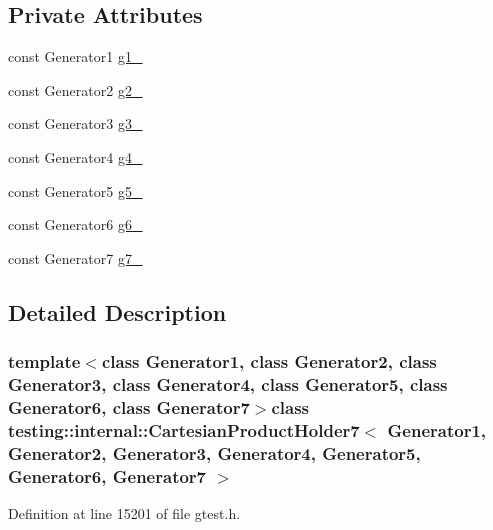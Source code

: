 \subsection*{\-Private \-Attributes}
\begin{DoxyCompactItemize}
\item 
const \-Generator1 \hyperlink{classtesting_1_1internal_1_1CartesianProductHolder7_a36a04c8f9e515291d6a093ab378084f7}{g1\-\_\-}
\item 
const \-Generator2 \hyperlink{classtesting_1_1internal_1_1CartesianProductHolder7_a6cfd9fa9a396d07747d5ebb1f05c7f22}{g2\-\_\-}
\item 
const \-Generator3 \hyperlink{classtesting_1_1internal_1_1CartesianProductHolder7_a79088ad1a5d8e0e316bd20057b9cfb3f}{g3\-\_\-}
\item 
const \-Generator4 \hyperlink{classtesting_1_1internal_1_1CartesianProductHolder7_afdb77af6126bc058715b1304ec0cc727}{g4\-\_\-}
\item 
const \-Generator5 \hyperlink{classtesting_1_1internal_1_1CartesianProductHolder7_ac153ca256cc6aabca132e9276e0b7e80}{g5\-\_\-}
\item 
const \-Generator6 \hyperlink{classtesting_1_1internal_1_1CartesianProductHolder7_ac5367ac6ea4b99933483d6181bace5c2}{g6\-\_\-}
\item 
const \-Generator7 \hyperlink{classtesting_1_1internal_1_1CartesianProductHolder7_afceade55d34273936f6cb3d7e4833d1b}{g7\-\_\-}
\end{DoxyCompactItemize}


\subsection{\-Detailed \-Description}
\subsubsection*{template$<$class Generator1, class Generator2, class Generator3, class Generator4, class Generator5, class Generator6, class Generator7$>$class testing\-::internal\-::\-Cartesian\-Product\-Holder7$<$ Generator1, Generator2, Generator3, Generator4, Generator5, Generator6, Generator7 $>$}



\-Definition at line 15201 of file gtest.\-h.



